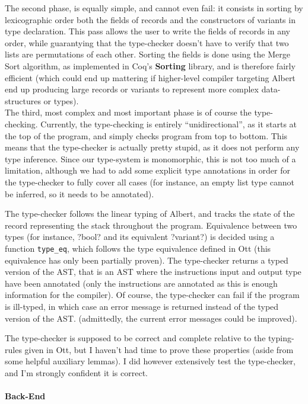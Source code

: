 \documentclass{report}
\begin{document}
The second phase, is equally simple, and cannot even fail: it consists in sorting by lexicographic order both the fields of records and the constructors of variants in type declaration. This pass allows the user to write the fields of records in any order, while guarantying that the type-checker doesn't have to verify that two lists are permutations of each other. Sorting the fields is done using the Merge Sort algorithm, as implemented in Coq's \textbf{Sorting} library, and is therefore fairly efficient (which could end up mattering if higher-level compiler targeting Albert end up producing large records or variants to represent more complex data-structures or types).\\

The third, most complex and most important phase is of course the type-checking. Currently, the type-checking is entirely ``unidirectional'', as it starts at the top of the program, and simply checks program from top to bottom. This means that the type-checker is actually pretty stupid, as it does not perform any type inference. Since our type-system is monomorphic, this is not too much of a limitation, although we had to add some explicit type annotations in order for the type-checker to fully cover all cases (for instance, an empty list type cannot be inferred, so it needs to be annotated).

The type-checker follows the linear typing of Albert, and tracks the state of the record representing the stack throughout the program. Equivalence between two types (for instance, ?bool? and its equivalent ?variant?) is decided using a function \texttt{type\_eq}, which follows the type equivalence defined in Ott (this equivalence has only been partially proven). The type-checker returns a typed version of the AST, that is an AST where the instructions input and output type have been annotated (only the instructions are annotated as this is enough information for the compiler). Of course, the type-checker can fail if the program is ill-typed, in which case an error message is returned instead of the typed version of the AST. (admittedly, the current error messages could be improved).

The type-checker is supposed to be correct and complete relative to the typing-rules given in Ott, but I haven't had time to prove these properties (aside from some helpful auxiliary lemmas). I did however extensively test the type-checker, and I'm strongly confident it is correct.

\paragraph{Back-End}
\end{document}
